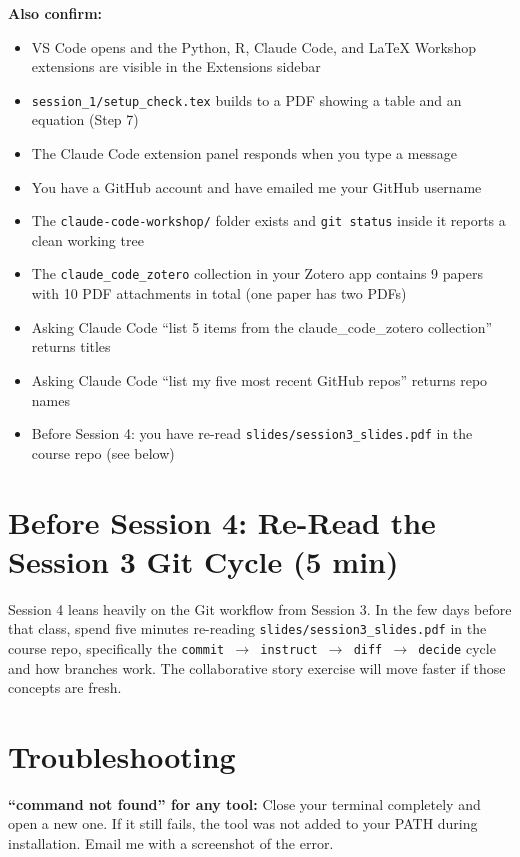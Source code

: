 \documentclass[11pt]{article}
\begin{document}
\textbf{Also confirm:}
\begin{itemize}[leftmargin=2em,itemsep=0pt]
  \item VS Code opens and the Python, R, Claude Code, and LaTeX Workshop extensions are visible in the Extensions sidebar
  \item \texttt{session\_1/setup\_check.tex} builds to a PDF showing a table and an equation (Step 7)
  \item The Claude Code extension panel responds when you type a message
  \item You have a GitHub account and have emailed me your GitHub username
  \item The \texttt{claude-code-workshop/} folder exists and \texttt{git status} inside it reports a clean working tree
  \item The \texttt{claude\_code\_zotero} collection in your Zotero app contains 9 papers with 10 PDF attachments in total (one paper has two PDFs)
  \item Asking Claude Code ``list 5 items from the claude\_code\_zotero collection'' returns titles
  \item Asking Claude Code ``list my five most recent GitHub repos'' returns repo names
  \item Before Session 4: you have re-read \texttt{slides/session3\_slides.pdf} in the course repo (see below)
\end{itemize}

\section*{Before Session 4: Re-Read the Session 3 Git Cycle (5 min)}
Session 4 leans heavily on the Git workflow from Session 3. In the few days before that class, spend five minutes re-reading \texttt{slides/session3\_slides.pdf} in the course repo, specifically the \texttt{commit $\rightarrow$ instruct $\rightarrow$ diff $\rightarrow$ decide} cycle and how branches work. The collaborative story exercise will move faster if those concepts are fresh.

\section*{Troubleshooting}

\textbf{``command not found'' for any tool:} Close your terminal completely and open a new one. If it still fails, the tool was not added to your PATH during installation. Email me with a screenshot of the error.
\end{document}
